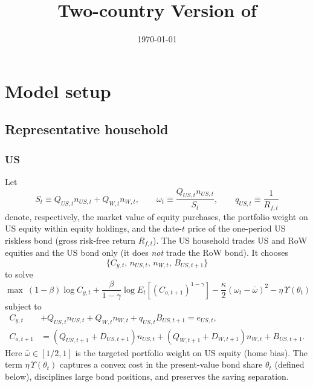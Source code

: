 \documentclass[12pt]{article}
\title{Two-country Version of \cite{hirano2025technological}
}
\author{
    }
\date{\today}
\theoremstyle{plain}
\begin{document}
{
\maketitle
}
\section{Model setup}

\subsection{Representative household}

\subsubsection{US}

Let
\[
S_t \equiv Q_{US,t}n_{US,t}+Q_{W,t}n_{W,t},
\qquad
\omega_t \equiv \frac{Q_{US,t}n_{US,t}}{S_t},
\qquad
q_{US,t}\equiv \frac{1}{R_{f,t}}
\]
denote, respectively, the market value of equity purchases, the portfolio weight on US equity within equity
holdings, and the date-$t$ price of the one-period US riskless bond (gross risk-free return $R_{f,t}$).
The US household trades US and RoW equities and the US bond only (it does \emph{not} trade the RoW bond).
It chooses
\[
\{C_{y,t},\,n_{US,t},\,n_{W,t},\,B_{US,t+1}\}
\]
to solve
\[
\max
\ (1-\beta)\log C_{y,t}
+\frac{\beta}{1-\gamma}\log E_t\!\left[(C_{o,t+1})^{1-\gamma}\right]
-\frac{\kappa}{2}(\omega_t-\bar\omega)^2
-\eta\,\Upsilon(\theta_t)
\]
subject to
\begin{align*}
C_{y,t}
&+Q_{US,t}n_{US,t}+Q_{W,t}n_{W,t}
+q_{US,t}B_{US,t+1}
= e_{US,t},\\
C_{o,t+1}
&=
(Q_{US,t+1}+D_{US,t+1})n_{US,t}
+(Q_{W,t+1}+D_{W,t+1})n_{W,t}
+B_{US,t+1}.
\end{align*}
Here $\bar\omega\in[1/2,1]$ is the targeted portfolio weight on US equity (home bias). The term
$\eta\,\Upsilon(\theta_t)$ captures a convex cost in the present-value bond share $\theta_t$ (defined below),
disciplines large bond positions, and preserves the saving separation.
\end{document}
